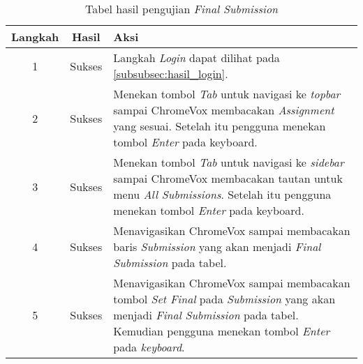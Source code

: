 \begin{table}[H]
	\centering
	\caption{Tabel hasil pengujian \textit{Final Submission}}
	\label{tab:hasil_final_submission}
	\begin{tabular}{|c|c|p{12cm}|}
		\toprule
		Langkah & Hasil & Aksi\\
		\midrule
		1 & Sukses & Langkah \textit{Login} dapat dilihat pada \ref{subsubsec:hasil_login}.\\
		2 & Sukses & Menekan tombol \textit{Tab} untuk navigasi ke \textit{topbar} sampai ChromeVox membacakan \textit{Assignment} yang sesuai. Setelah itu pengguna menekan tombol \textit{Enter} pada keyboard.\\
		3 & Sukses & Menekan tombol \textit{Tab} untuk navigasi ke \textit{sidebar} sampai ChromeVox membacakan tautan untuk menu \textit{All Submissions}. Setelah itu pengguna menekan tombol \textit{Enter} pada keyboard.\\
		4 & Sukses & Menavigasikan ChromeVox sampai membacakan baris \textit{Submission} yang akan menjadi \textit{Final Submission} pada tabel.\\
		5 & Sukses & Menavigasikan ChromeVox sampai membacakan tombol \textit{Set Final} pada \textit{Submission} yang akan menjadi \textit{Final Submission} pada tabel. Kemudian pengguna menekan tombol \textit{Enter} pada \textit{keyboard}.\\
		\bottomrule
	\end{tabular}
\end{table}